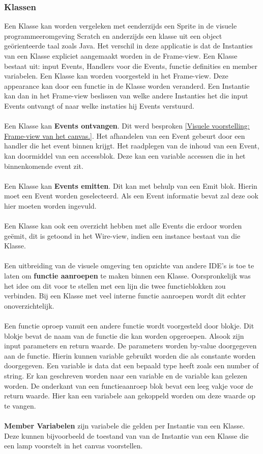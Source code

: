 \documentclass[]{article}
\begin{document}
\subsubsection{Klassen}
\label{Klassen}
Een Klasse kan worden vergeleken met eenderzijds een Sprite in de visuele programmeeromgeving Scratch \cite{scratch} en anderzijds een klasse uit een object ge\"{o}rienteerde taal zoals Java. Het verschil in deze applicatie is dat de Instanties van een Klasse expliciet aangemaakt worden in de Frame-view. Een Klasse bestaat uit: input Events, Handlers voor die Events, functie definities en member variabelen. Een Klasse kan worden voorgesteld in het Frame-view. Deze appearance kan door een functie in de Klasse worden veranderd. Een Instantie kan dan in het Frame-view beslissen van welke andere Instanties het die input Events ontvangt of naar welke instaties hij Events verstuurd. \\\\ Een Klasse kan \textbf{Events ontvangen}. Dit werd besproken \ref{Visuele voorstelling: Frame-view van het canvas.}. Het afhandelen van een Event gebeurt door een handler die het event binnen krijgt. Het raadplegen van de inhoud van een Event, kan doormiddel van een accessblok. Deze kan een variable accessen die in het binnenkomende event zit. \\\\Een Klasse kan \textbf{Events emitten}. Dit kan met behulp van een Emit blok. Hierin moet een Event worden geselecteerd. Als een Event informatie bevat zal deze ook hier moeten worden ingevuld. \\\\Een Klasse kan ook een overzicht hebben met alle Events die erdoor worden ge\"emit, dit is getoond in het Wire-view, indien een instance bestaat van die Klasse.\\\\Een uitbreiding van de visuele omgeving ten opzichte van andere IDE's is toe te laten om \textbf{functie aanroepen} te maken binnen een Klasse. Oorspronkelijk was het idee om dit voor te stellen met een lijn die twee functieblokken zou verbinden. Bij een Klasse met veel interne functie aanroepen wordt dit echter onoverzichtelijk.\\\\Een functie oproep vanuit een andere functie wordt voorgesteld door blokje. Dit blokje bevat de naam van de functie die kan worden opgeroepen. Alsook zijn input parameters en return waarde. De parameters worden by-value doorgegeven aan de functie. Hierin kunnen variable gebruikt worden die als constante worden doorgegeven. Een variable is data dat een bepaald type heeft zoals een number of string. Er kan geschreven worden naar een variable en de variable kan gelezen worden. De onderkant van een functieaanroep blok bevat een leeg vakje voor de return waarde. Hier kan een variabele aan gekoppeld worden om deze waarde op te vangen.\\\\\textbf{Member Variabelen} zijn variabele die gelden per Instantie van een Klasse. Deze kunnen bijvoorbeeld de toestand van van de Instantie van een Klasse die een lamp voorstelt in het canvas voorstellen.
 
\end{document}
